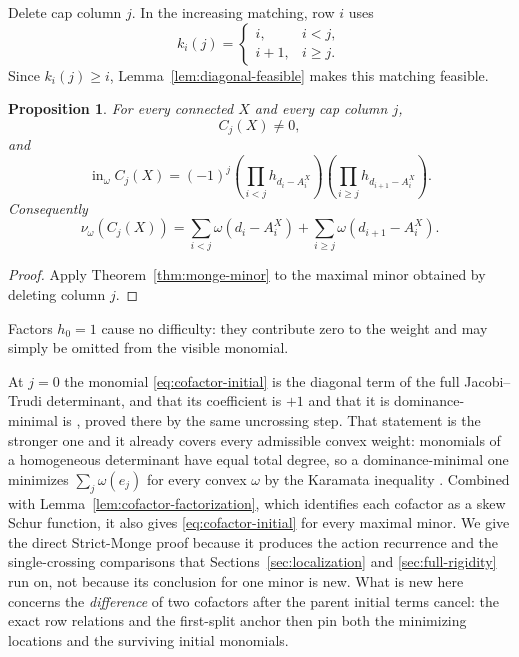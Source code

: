 \documentclass[11pt,a4paper]{amsart}
\numberwithin{equation}{section}
\theoremstyle{plain}
\newtheorem{proposition}[theorem]{Proposition}
\theoremstyle{definition}
\newcommand{\wto}{\nu_{\omega}}
\newcommand{\inin}{\operatorname{in}}
\begin{document}
Delete cap column \(j\).  In the increasing matching, row \(i\) uses
\begin{equation}\label{eq:matching-index}
k_i(j)=
\begin{cases}
 i,&i<j,\\
 i+1,&i\ge j.
\end{cases}
\end{equation}
Since \(k_i(j)\ge i\), Lemma~\ref{lem:diagonal-feasible} makes this matching feasible.

\begin{proposition}\label{prop:cofactor-initial}
For every connected \(X\) and every cap column \(j\),
\[
C_j(X)\ne0,
\]
and
\begin{equation}\label{eq:cofactor-initial}
\inin_{\omega}C_j(X)
=
(-1)^j
\left(\prod_{i<j}h_{d_i-A_i^X}\right)
\left(\prod_{i\ge j}h_{d_{i+1}-A_i^X}\right).
\end{equation}
Consequently
\begin{equation}\label{eq:cofactor-val}
\wto(C_j(X))
=
\sum_{i<j}\omega(d_i-A_i^X)
+
\sum_{i\ge j}\omega(d_{i+1}-A_i^X).
\end{equation}
\end{proposition}

\begin{proof}
Apply Theorem~\ref{thm:monge-minor} to the maximal minor obtained by deleting column \(j\).
\end{proof}

Factors \(h_0=1\) cause no difficulty: they contribute zero to the weight and may simply be omitted from the visible monomial.

At \(j=0\) the monomial \eqref{eq:cofactor-initial} is the diagonal term of the full Jacobi--Trudi determinant, and that its coefficient is \(+1\) and that it is dominance-minimal is \cite[Prop.~6.2(ii)]{Reiner2007Coincidences}, proved there by the same uncrossing step.  That statement is the stronger one and it already covers every admissible convex weight: monomials of a homogeneous determinant have equal total degree, so a dominance-minimal one minimizes \(\sum_j\omega(e_j)\) for every convex \(\omega\) by the Karamata inequality \cite[Ch.~3, \S C]{MarshallOlkinArnold2011Majorization}.  Combined with Lemma~\ref{lem:cofactor-factorization}, which identifies each cofactor as a skew Schur function, it also gives \eqref{eq:cofactor-initial} for every maximal minor.  We give the direct Strict-Monge proof because it produces the action recurrence and the single-crossing comparisons that Sections~\ref{sec:localization} and \ref{sec:full-rigidity} run on, not because its conclusion for one minor is new.  What is new here concerns the \emph{difference} of two cofactors after the parent initial terms cancel: the exact row relations and the first-split anchor then pin both the minimizing locations and the surviving initial monomials.
\end{document}
